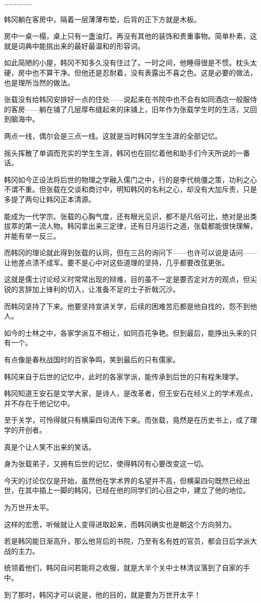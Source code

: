 ………………

韩冈躺在客房中，隔着一层薄薄布垫，后背的正下方就是木板。

房中一桌一榻，桌上只有一盏油灯。再没有其他的装饰和贵重事物。简单朴素，这就是词典中能挑出来的最好最温和的形容词。

如此简陋的小屋，韩冈不知多久没有住过了。一时之间，他睡得很是不惯。枕头太硬，房中也不算干净。但他还是忍耐着，没有表露出不喜之色。这是必要的做法，也是理所当然的做法。

张载没有给韩冈安排好一点的住处——说起来在书院中也不会有如同酒店一般服侍的客房——躺在铺了几层厚布缝起来的床铺上，旧年作为张载学生时的生活，又回到脑海中。

两点一线，偶尔会是三点一线。这就是当时韩冈学生生涯的全部记忆。

摇头挥散了单调而充实的学生生涯，韩冈也在回忆着他和助手们今天所说的一番话。

韩冈如今正设法将后世的物理之学融入儒门之中，行的是李代桃僵之策，功利之心不谓不重。但张载在交谈和商讨中，明知韩冈的名利之心，却没有大加斥责，只是多提了两句让韩冈正本清源。

能成为一代学宗。张载的心胸气度，还有眼光见识，都不是凡俗可比，绝对是出类拔萃的第一流人物。韩冈拿出来三定律，还有日月运行之道，张载都能很快理解，并能有举一反三。

而韩冈的理论就此得到张载的认同，但在三吕的询问下——也许可以说是诘问——让他差点溃不成军。要不是心中对这些道理的坚持，几乎都要改弦更张。

这就是儒士讨论经义时常常出现的辩难，目的虽不一定是要否定对方的观点，但尖锐的言辞加上锋利的切入，让准备不足的士子折戟沉沙。

而韩冈坚持了下来。他要坚持宣讲关学，后续的困难苦厄都是他自找的，怨不到他人。

如今的士林之中，各家学派互不相让，如同百花争艳。但到最后，能挣出头来的只有一个。

有点像是春秋战国时的百家争鸣，笑到最后的只有儒家。

韩冈来自于后世的记忆中，此时的各家学派，能传承到后世的只有程朱理学。

韩冈知道王安石是文学大家，是诗人，是改革者，但王安石在经义上的学术观点，并不存在于他记忆中。

至于关学，可怜得就只有横渠四句流传下来。而张载，竟然是在历史书上，成了理学的开创者。

真是个让人笑不出来的笑话。

身为张载弟子，又拥有后世的记忆，使得韩冈有心要改变这一切。

今天的讨论仅仅是开始，虽然他在学术界的名望并不高，但横渠四句既然已经出世，在其中插上一脚的韩冈，已经在他的同学们的心目之中，建立了他的地位。

为万世开太平。

这样的宏愿，听候就让人变得进取起来，而韩冈确实也是朝这个方向努力。

若是韩冈能日渐高升，那么他背后的书院，乃至有名有姓的官员，都会日后学派大战的主力。

统领着他们，韩冈自问若能将之收服，就是大半个关中士林清议落到了自家的手中。

到了那时，韩冈才可以说是，他的目的，就是要为万世开太平！

